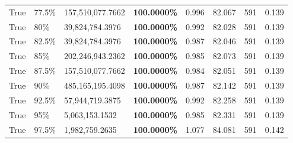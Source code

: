 \begin{table}[H]
\begin{tabular}{lllrllll}
\cline{1-8} \cline{2-8}
True & 77.5\% & 157,510,077.7662 & \bfseries \color{red} 100.0000\% & 0.996 & 82.067 & 591 & 0.139 \\
\cline{1-8} \cline{2-8}
True & 80\% & 39,824,784.3976 & \bfseries \color{red} 100.0000\% & 0.992 & 82.028 & 591 & 0.139 \\
\cline{1-8} \cline{2-8}
True & 82.5\% & 39,824,784.3976 & \bfseries \color{red} 100.0000\% & 0.987 & 82.046 & 591 & 0.139 \\
\cline{1-8} \cline{2-8}
True & 85\% & 202,246,943.2362 & \bfseries \color{red} 100.0000\% & 0.985 & 82.073 & 591 & 0.139 \\
\cline{1-8} \cline{2-8}
True & 87.5\% & 157,510,077.7662 & \bfseries \color{red} 100.0000\% & 0.984 & 82.051 & 591 & 0.139 \\
\cline{1-8} \cline{2-8}
True & 90\% & 485,165,195.4098 & \bfseries \color{red} 100.0000\% & 0.987 & 82.142 & 591 & 0.139 \\
\cline{1-8} \cline{2-8}
True & 92.5\% & 57,944,719.3875 & \bfseries \color{red} 100.0000\% & 0.992 & 82.258 & 591 & 0.139 \\
\cline{1-8} \cline{2-8}
True & 95\% & 5,063,153.1532 & \bfseries \color{red} 100.0000\% & 0.985 & 82.331 & 591 & 0.139 \\
\cline{1-8} \cline{2-8}
True & 97.5\% & 1,982,759.2635 & \bfseries \color{red} 100.0000\% & 1.077 & 84.081 & 591 & 0.142 \\
\cline{1-8} \cline{2-8}
\bottomrule
\end{tabular}
\end{table}
